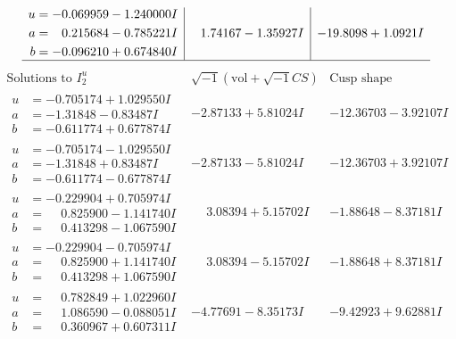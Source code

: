 \documentclass[1p]{elsarticle_modified}
\theoremstyle{definition}
\newcommand{\I}{\sqrt{-1}}
\begin{document}
$$\begin{array}{c|c|c}
\begin{aligned}
u &= -0.069959 - 1.240000 I \\
a &= \phantom{-}0.215684 - 0.785221 I \\
b &= -0.096210 + 0.674840 I\end{aligned}
 & \phantom{-}1.74167 - 1.35927 I & -19.8098 + 1.0921 I\\
 \hline 
 \end{array}$$\newpage$$\begin{array}{c|c|c}  
\text{Solutions to }I^u_{2}& \I (\text{vol} + \sqrt{-1}CS) & \text{Cusp shape}\\
 \hline 
\begin{aligned}
u &= -0.705174 + 1.029550 I \\
a &= -1.31848 - 0.83487 I \\
b &= -0.611774 + 0.677874 I\end{aligned}
 & -2.87133 + 5.81024 I & -12.36703 - 3.92107 I \\ \hline\begin{aligned}
u &= -0.705174 - 1.029550 I \\
a &= -1.31848 + 0.83487 I \\
b &= -0.611774 - 0.677874 I\end{aligned}
 & -2.87133 - 5.81024 I & -12.36703 + 3.92107 I \\ \hline\begin{aligned}
u &= -0.229904 + 0.705974 I \\
a &= \phantom{-}0.825900 - 1.141740 I \\
b &= \phantom{-}0.413298 - 1.067590 I\end{aligned}
 & \phantom{-}3.08394 + 5.15702 I & -1.88648 - 8.37181 I \\ \hline\begin{aligned}
u &= -0.229904 - 0.705974 I \\
a &= \phantom{-}0.825900 + 1.141740 I \\
b &= \phantom{-}0.413298 + 1.067590 I\end{aligned}
 & \phantom{-}3.08394 - 5.15702 I & -1.88648 + 8.37181 I \\ \hline\begin{aligned}
u &= \phantom{-}0.782849 + 1.022960 I \\
a &= \phantom{-}1.086590 - 0.088051 I \\
b &= \phantom{-}0.360967 + 0.607311 I\end{aligned}
 & -4.77691 - 8.35173 I & -9.42923 + 9.62881 I \\ \hline\begin{aligned}

\end{aligned}
\end{array}$$
\end{document}
